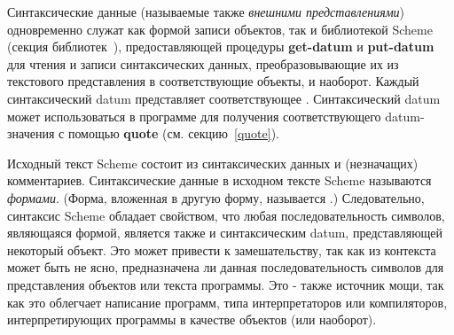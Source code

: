 Синтаксические данные (называемые также \textit{внешними представлениями}) одновременно служат как формой записи объектов, так и библиотекой Scheme
{\bfseries{}} (секция библиотек~),
предоставляющей процедуры {\cf\bfseries get-datum} и {\cf\bfseries put-datum} для чтения и
записи синтаксических данных, преобразовывающие их из текстового представления в
соответствующие объекты, и наоборот. Каждый синтаксический datum представляет соответствующее
. Синтаксический datum может использоваться в программе для
получения соответствующего datum-значения с помощью {\cf\bfseries quote}
(см. секцию~\ref{quote}).

Исходный текст Scheme состоит из синтаксических данных и (незначащих)
комментариев. Синтаксические данные в исходном тексте Scheme называются
\textit{формами}. (Форма, вложенная в другую форму, называется
.) Следовательно, синтаксис Scheme обладает свойством, что любая
последовательность символов, являющаяся формой, является также и синтаксическим datum,
представляющей некоторый объект. Это может привести к замешательству, так как из контекста может
быть не ясно, предназначена ли данная последовательность символов для представления объектов или
текста программы. Это - также источник мощи, так как это облегчает написание программ,
типа интерпретаторов или компиляторов, интерпретирующих программы в качестве объектов (или
наоборот).

